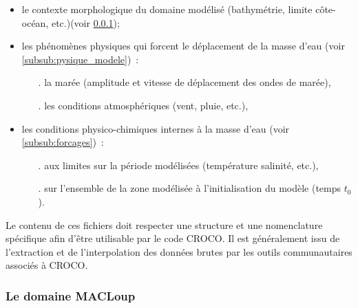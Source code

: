 \documentclass[10pt,a4paper,titlepage]{article}
\begin{document}
    \begin{itemize}
        \item le contexte morphologique du domaine modélisé (bathymétrie, limite côte-océan, etc.)(voir \ref{subsub:grille_croco});
        \item les phénomènes physiques qui forcent le déplacement de la masse d'eau (voir \ref{subsub:pysique_modele})~:
        \begin{itemize}
            \item[.] la marée (amplitude et vitesse de déplacement des ondes de marée),
            \item[.] les conditions atmosphériques (vent, pluie, etc.),
        \end{itemize}
        \item les conditions physico-chimiques internes à la masse d'eau (voir \ref{subsub:forcages})~:
        \begin{itemize}
            \item[.] aux limites sur la période modélisées (température salinité, etc.),
            \item[.] sur l'ensemble de la zone modélisée à l'initialisation du modèle (temps $t_{0}$).
        \end{itemize}
    \end{itemize}
    Le contenu de ces fichiers doit respecter une structure et une nomenclature spécifique afin d'être utilisable par le code CROCO.
    Il est généralement issu de l'extraction et de l'interpolation des données brutes par les outils communautaires associés à CROCO.
    
    
    \subsubsection{Le domaine MACLoup}
    \label{subsub:grille_croco}
    
\end{document}
